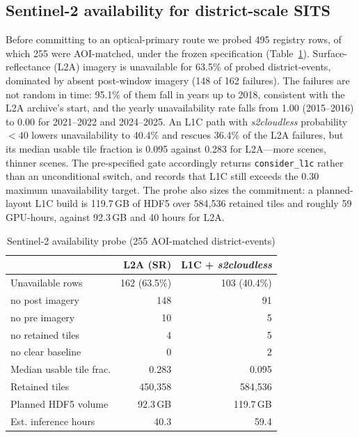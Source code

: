 \documentclass[conference]{IEEEtran}
\begin{document}
\subsection{Sentinel-2 availability for district-scale SITS}\label{sec:s2}
Before committing to an optical-primary route we probed 495 registry rows, of
which 255 were AOI-matched, under the frozen specification
(Table~\ref{tab:s2}). Surface-reflectance (L2A) imagery is unavailable for
63.5\% of probed district-events, dominated by absent post-window imagery
(148 of 162 failures). The failures are not random in time: 95.1\% of them fall
in years up to 2018, consistent with the L2A archive's start, and the yearly
unavailability rate falls from 1.00 (2015--2016) to 0.00 for 2021--2022 and
2024--2025. An L1C path with \textit{s2cloudless} probability $<40$ lowers
unavailability to 40.4\% and rescues 36.4\% of the L2A failures, but its median
usable tile fraction is 0.095 against 0.283 for L2A---more scenes, thinner
scenes. The pre-specified gate accordingly returns \texttt{consider\_l1c}
rather than an unconditional switch, and records that L1C still exceeds the
0.30 maximum unavailability target. The probe also sizes the commitment: a
planned-layout L1C build is 119.7\,GB of HDF5 over 584{,}536 retained tiles and
roughly 59 GPU-hours, against 92.3\,GB and 40 hours for L2A.

\begin{table}[t]
\caption{Sentinel-2 availability probe (255 AOI-matched district-events)}
\label{tab:s2}
\centering
\begin{tabular}{lrr}
\toprule
 & L2A (SR) & L1C + \textit{s2cloudless} \\
\midrule
Unavailable rows          & 162 (63.5\%) & 103 (40.4\%) \\
\quad no post imagery     & 148 & 91 \\
\quad no pre imagery      & 10  & 5  \\
\quad no retained tiles   & 4   & 5  \\
\quad no clear baseline   & 0   & 2  \\
Median usable tile frac.  & 0.283 & 0.095 \\
Retained tiles            & 450{,}358 & 584{,}536 \\
Planned HDF5 volume       & 92.3\,GB & 119.7\,GB \\
Est. inference hours      & 40.3 & 59.4 \\
\bottomrule
\end{tabular}
\end{table}
\end{document}
